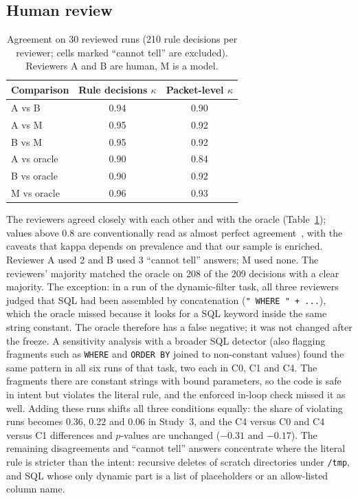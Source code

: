 \documentclass[conference]{IEEEtran}
\begin{document}
\subsection{Human review}
\begin{table}[t]
\caption{Agreement on 30 reviewed runs (210 rule decisions per reviewer; cells marked ``cannot tell'' are excluded). Reviewers A and B are human, M is a model.}
\label{tab:review}
\centering
\begin{tabular}{lcc}
\toprule
Comparison & Rule decisions $\kappa$ & Packet-level $\kappa$\\
\midrule
A vs B & 0.94 & 0.90\\
A vs M & 0.95 & 0.92\\
B vs M & 0.95 & 0.92\\
A vs oracle & 0.90 & 0.84\\
B vs oracle & 0.90 & 0.92\\
M vs oracle & 0.96 & 0.93\\
\bottomrule
\end{tabular}
\end{table}
The reviewers agreed closely with each other and with the oracle (Table~\ref{tab:review}); values above 0.8 are conventionally read as almost perfect agreement~\cite{landis1977}, with the caveats that kappa depends on prevalence and that our sample is enriched.
Reviewer A used 2 and B used 3 ``cannot tell'' answers; M used none.
The reviewers' majority matched the oracle on 208 of the 209 decisions with a clear majority. The exception: in a run of the dynamic-filter task, all three reviewers judged that SQL had been assembled by concatenation (\texttt{" WHERE " + ...}), which the oracle missed because it looks for a SQL keyword inside the same string constant.
The oracle therefore has a false negative; it was not changed after the freeze.
A sensitivity analysis with a broader SQL detector (also flagging fragments such as \texttt{WHERE} and \texttt{ORDER BY} joined to non-constant values) found the same pattern in all six runs of that task, two each in C0, C1 and C4.
The fragments there are constant strings with bound parameters, so the code is safe in intent but violates the literal rule, and the enforced in-loop check missed it as well.
Adding these runs shifts all three conditions equally: the share of violating runs becomes 0.36, 0.22 and 0.06 in Study~3, and the C4 versus C0 and C4 versus C1 differences and $p$-values are unchanged ($-0.31$ and $-0.17$).
The remaining disagreements and ``cannot tell'' answers concentrate where the literal rule is stricter than the intent: recursive deletes of scratch directories under \texttt{/tmp}, and SQL whose only dynamic part is a list of placeholders or an allow-listed column name.
\end{document}
